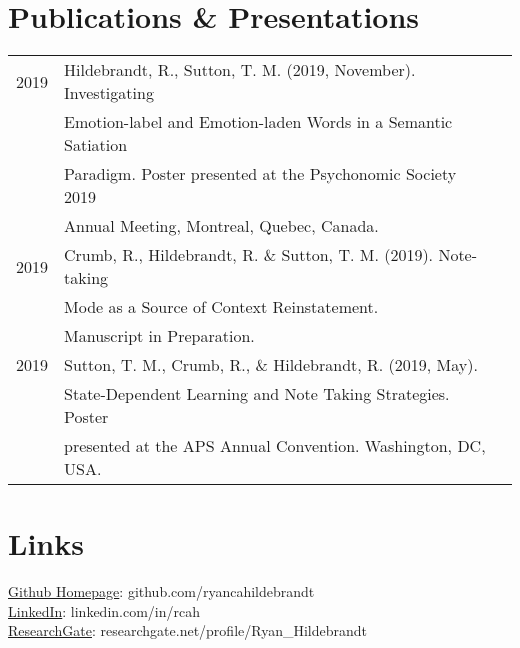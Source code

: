 \documentclass[letterpaper]{deedy-resume} %
\begin{document}
\section{Publications \& Presentations} 
\begin{tabular}{rll}
2019 & Hildebrandt, R., Sutton, T. M. (2019, November). Investigating \\
& Emotion-label and Emotion-laden Words in a Semantic Satiation\\
& Paradigm. Poster presented at the Psychonomic Society 2019\\ 
& Annual Meeting, Montreal, Quebec, Canada. \\
2019 & Crumb, R., Hildebrandt, R. \& Sutton, T. M. (2019). Note-taking\\
& Mode as a Source of Context Reinstatement.\\ 
& Manuscript in Preparation.\\
2019 & Sutton, T. M., Crumb, R., \& Hildebrandt, R. (2019, May).\\ 
& State-Dependent Learning and Note Taking Strategies. Poster\\ 
& presented at the APS Annual Convention. Washington, DC, USA.\\
\end{tabular}
\sectionspace %

\section{Links} 
\href{https://github.com/ryancahildebrandt}{Github Homepage}: github.com/ryancahildebrandt \\
\href{https://linkedin.com/in/rcah}{LinkedIn}: linkedin.com/in/rcah \\
\href{https://researchgate.net/profile/Ryan\_Hildebrandt}{ResearchGate}: researchgate.net/profile/Ryan\_Hildebrandt 
\hfill
\end{document}
